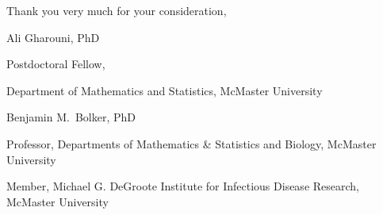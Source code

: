 \documentclass[12pt,letterpaper]{letter}
\begin{document}
Thank you very much for your consideration,

\begin{flushleft}
\footnotesize

Ali Gharouni, PhD
\setlength{\parskip}{0em}

Postdoctoral Fellow, 

Department of Mathematics and Statistics, McMaster University

\vspace{1em}

Benjamin M.\ Bolker, PhD

Professor, Departments of Mathematics \& Statistics and Biology, McMaster University

Member, Michael G. DeGroote Institute for Infectious Disease Research, McMaster University

\end{flushleft}

\thispagestyle{empty}
\end{document}
